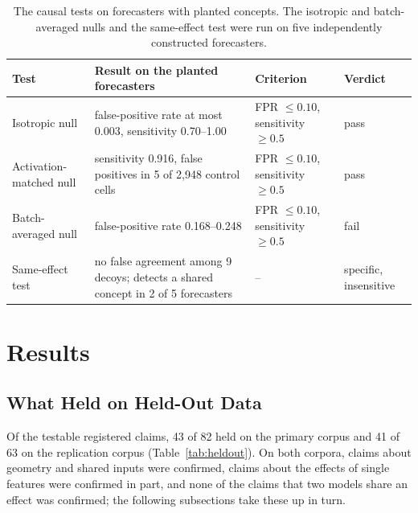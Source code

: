 \documentclass[twoside,11pt]{article}
\begin{document}
\begin{table}[!tb]
\centering
\small
\setlength{\tabcolsep}{4pt}
\begin{tabularx}{\textwidth}{@{}>{\raggedright\arraybackslash}p{3.4cm}>{\raggedright\arraybackslash}X>{\raggedright\arraybackslash}p{2.5cm}l@{}}
\toprule
Test & Result on the planted forecasters & Criterion & Verdict \\
\midrule
Isotropic null & false-positive rate at most 0.003, sensitivity 0.70--1.00 & FPR $\le 0.10$, sensitivity $\ge 0.5$ & pass \\
Activation-matched null & sensitivity 0.916, false positives in 5 of 2{,}948 control cells & FPR $\le 0.10$, sensitivity $\ge 0.5$ & pass \\
Batch-averaged null & false-positive rate 0.168--0.248 & FPR $\le 0.10$, sensitivity $\ge 0.5$ & fail \\
Same-effect test & no false agreement among 9 decoys; detects a shared concept in 2 of 5 forecasters & -- & specific, insensitive \\
\bottomrule
\end{tabularx}
\caption{The causal tests on forecasters with planted concepts. The isotropic and batch-averaged nulls and the same-effect test were run on five independently constructed forecasters.}
\label{tab:knownanswer}
\end{table}

\section{Results}
\label{sec:results}

\subsection{What Held on Held-Out Data}
\label{sec:heldout}

Of the testable registered claims, 43 of 82 held on the primary corpus and 41 of 63 on the replication corpus (Table~\ref{tab:heldout}).
On both corpora, claims about geometry and shared inputs were confirmed, claims about the effects of single features were confirmed in part, and none of the claims that two models share an effect was confirmed; the following subsections take these up in turn.
\end{document}
